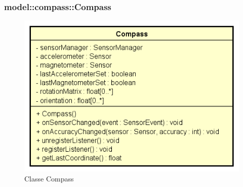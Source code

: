 \documentclass[../DefinizioneDiProdotto.tex]{subfiles}
\begin{document}
\subsubsection{model::compass::Compass}

    \begin{figure}[H]
        \centering
        \includegraphics{img/Compass.png}
        \caption{Classe Compass}\label{fig:model::compass::Compass} 
    \end{figure}
\end{document}
